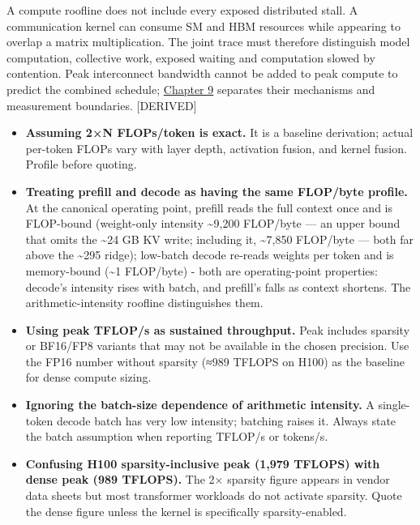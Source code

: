 A compute roofline does not include every exposed distributed stall. A
communication kernel can consume SM and HBM resources while appearing to
overlap a matrix multiplication. The joint trace must therefore
distinguish model computation, collective work, exposed waiting and
computation slowed by contention. Peak interconnect bandwidth cannot be
added to peak compute to predict the combined schedule; \hyperref[chap:9]{Chapter 9}
separates their mechanisms and measurement boundaries. \mbox{{[}DERIVED{]}}

\label{common-mistakes}


\begin{itemize}
\item
  \textbf{Assuming 2×N FLOPs/token is exact.} It is a baseline
  derivation; actual per-token FLOPs vary with layer depth, activation
  fusion, and kernel fusion. Profile before quoting.
\item
  \textbf{Treating prefill and decode as having the same FLOP/byte
  profile.} At the canonical operating point, prefill reads the full
  context once and is FLOP-bound (weight-only intensity
  \textasciitilde9,200 FLOP/byte --- an upper bound that omits the
  \textasciitilde24 GB KV write; including it, \textasciitilde7,850
  FLOP/byte --- both far above the \textasciitilde295 ridge); low-batch
  decode re-reads weights per token and is memory-bound
  (\textasciitilde1 FLOP/byte) - both are operating-point properties:
  decode's intensity rises with batch, and prefill's falls as context
  shortens. The arithmetic-intensity roofline distinguishes them.
\item
  \textbf{Using peak TFLOP/s as sustained throughput.} Peak includes
  sparsity or BF16/FP8 variants that may not be available in the chosen
  precision. Use the FP16 number without sparsity (≈989 TFLOPS on H100)
  as the baseline for dense compute sizing.
\item
  \textbf{Ignoring the batch-size dependence of arithmetic intensity.} A
  single-token decode batch has very low intensity; batching raises it.
  Always state the batch assumption when reporting TFLOP/s or tokens/s.
\item
  \textbf{Confusing H100 sparsity-inclusive peak (1,979 TFLOPS) with
  dense peak (989 TFLOPS).} The 2× sparsity figure appears in vendor
  data sheets but most transformer workloads do not activate sparsity.
  Quote the dense figure unless the kernel is specifically
  sparsity-enabled.
\end{itemize}

